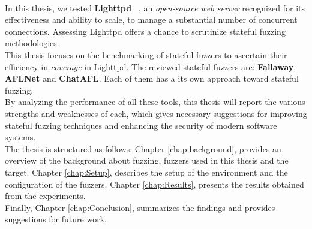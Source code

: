 \\In this thesis, we tested \textbf{Lighttpd} ~\cite{lighttpd}, an \textit{open-source web server} recognized for its effectiveness and ability to scale, to manage a substantial number of concurrent connections. Assessing Lighttpd offers a chance to scrutinize stateful fuzzing methodologies.
\\This thesis focuses on the benchmarking of stateful fuzzers to ascertain their efficiency in \textit{coverage} in Lighttpd. The reviewed stateful fuzzers are: \textbf{Fallaway}, \textbf{AFLNet} and \textbf{ChatAFL}. Each of them has a its own approach toward stateful fuzzing.
\\By analyzing the performance of all these tools, this thesis will report the various strengths and weaknesses of each, which gives necessary suggestions for improving stateful fuzzing techniques and enhancing the security of modern software systems.
\\The thesis is structured as follows: Chapter \ref{chap:background}, provides an overview of the background about fuzzing, fuzzers used in this thesis and the target. Chapter \ref{chap:Setup}, describes the setup of the environment and the configuration of the fuzzers. Chapter \ref{chap:Results}, presents the results obtained from the experiments.
\\Finally, Chapter \ref{chap:Conclusion}, summarizes the findings and provides suggestions for future work.